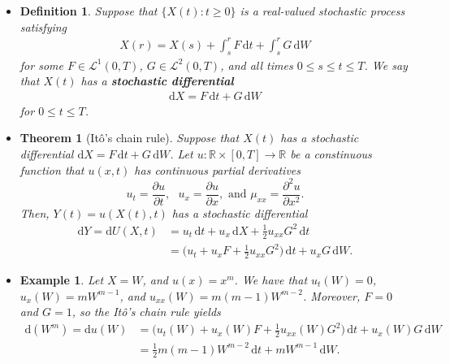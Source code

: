 \documentclass[10pt]{article}
\newtheorem{theorem}[lemma]{Theorem}
\newtheorem{definition}[lemma]{Definition}
\newtheorem{example}[lemma]{Example}
\newcommand{\dee}{\mathrm{d}}
\newcommand{\mcal}[1]{\mathcal{#1}}
\newcommand{\Real}{\mathbb{R}}
\begin{document}
\begin{itemize}
  \item \begin{definition}
    Suppose that $\{ X(t) : t \geq 0 \}$ is a real-valued stochastic process satisfying
    \begin{align*}
      X(r) = X(s) + \int_s^r F\, \dee t + \int_s^r G\, \dee W
    \end{align*}
    for some $F \in \mcal{L}^1(0,T)$, $G \in \mcal{L}^2(0,T)$, and all times $0 \leq s \leq t \leq T$. We say that $X(t)$ has a {\bf stochastic differential}
    \begin{align*}
      \dee X = F\, \dee t + G\, \dee W
    \end{align*}
    for $0 \leq t \leq T$.
  \end{definition}

  \item \begin{theorem}[It\^{o}'s chain rule]
    Suppose that $X(t)$ has a stochastic differential $\dee X = F\, \dee t + G\, \dee W$. Let $u: \Real \times [0,T] \rightarrow \Real$ be a constinuous function that $u(x,t)$ has continuous partial derivatives $$u_t = \frac{\partial u}{\partial t},\mbox{ }u_x = \frac{\partial u}{\partial x},\mbox{ and }\mu_{xx} = \frac{\partial^2 u}{\partial x^2}.$$ Then, $Y(t) = u(X(t),t)$ has a stochastic differential 
    \begin{align*}
      \dee Y = \dee U(X,t) 
      &= u_t\,\dee t + u_x\, \dee X + \frac{1}{2} u_{xx} G^2\, \dee t \\
      &= \bigg(u_t + u_x F + \frac{1}{2}u_{xx} G^2\bigg)\, \dee t + u_x G\, \dee W.
    \end{align*}
  \end{theorem}

  \item \begin{example}
    Let $X = W$, and $u(x) = x^m$. We have that $u_t(W) = 0$, $u_x(W) = mW^{m-1}$, and $u_{xx}(W) = m(m-1)W^{m-2}$. Moreover, $F = 0$ and $G = 1$, so the It\^{o}'s chain rule yields
    \begin{align*}
      \dee(W^m) 
      = \dee u(W)
      &= \bigg(u_t(W) + u_x(W) F + \frac{1}{2}u_{xx}(W) G^2\bigg)\, \dee t + u_x(W) G\, \dee W \\
      &= \frac{1}{2} m(m-1) W^{m-2}\, \dee t + mW^{m-1}\, \dee W.
    \end{align*}
  \end{example}


\end{itemize}
\end{document}
